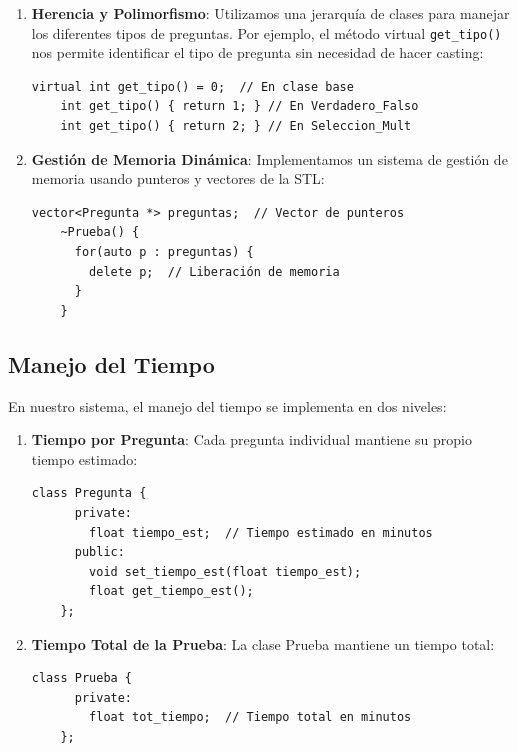 \documentclass[12pt]{article}
\begin{document}
\begin{enumerate}
    \item \textbf{Herencia y Polimorfismo}: Utilizamos una jerarqu\'ia de clases para manejar los diferentes tipos de preguntas. Por ejemplo, el m\'etodo virtual \texttt{get\_tipo()} nos permite identificar el tipo de pregunta sin necesidad de hacer casting:
    \begin{lstlisting}[style=customc]
    virtual int get_tipo() = 0;  // En clase base
    int get_tipo() { return 1; } // En Verdadero_Falso
    int get_tipo() { return 2; } // En Seleccion_Mult
    \end{lstlisting}

    \item \textbf{Gesti\'on de Memoria Din\'amica}: Implementamos un sistema de gesti\'on de memoria usando punteros y vectores de la STL:
    \begin{lstlisting}[style=customc]
    vector<Pregunta *> preguntas;  // Vector de punteros
    ~Prueba() {
      for(auto p : preguntas) {
        delete p;  // Liberación de memoria
      }
    }
    \end{lstlisting}
\end{enumerate}

\subsection{Manejo del Tiempo}
En nuestro sistema, el manejo del tiempo se implementa en dos niveles:

\begin{enumerate}
    \item \textbf{Tiempo por Pregunta}: Cada pregunta individual mantiene su propio tiempo estimado:
    \begin{lstlisting}[style=customc]
    class Pregunta {
      private:
        float tiempo_est;  // Tiempo estimado en minutos
      public:
        void set_tiempo_est(float tiempo_est);
        float get_tiempo_est();
    };
    \end{lstlisting}

    \item \textbf{Tiempo Total de la Prueba}: La clase Prueba mantiene un tiempo total:
    \begin{lstlisting}[style=customc]
    class Prueba {
      private:
        float tot_tiempo;  // Tiempo total en minutos
    };
    \end{lstlisting}
\end{enumerate}
\end{document}
